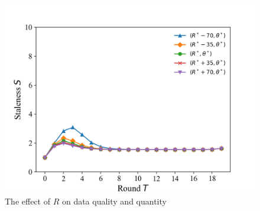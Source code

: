 \documentclass{article}
\theoremstyle{plain}
\theoremstyle{definition}
\theoremstyle{remark}
\begin{document}
\begin{figure}
\begin{minipage}{0.33\linewidth}
		\vspace{3pt}
		\centerline{\includegraphics[width=\textwidth]{figures/figure_55_C.png}}
	\end{minipage}
	\caption{The effect of $R$ on data quality and quantity}
\end{figure}

\end{document}
